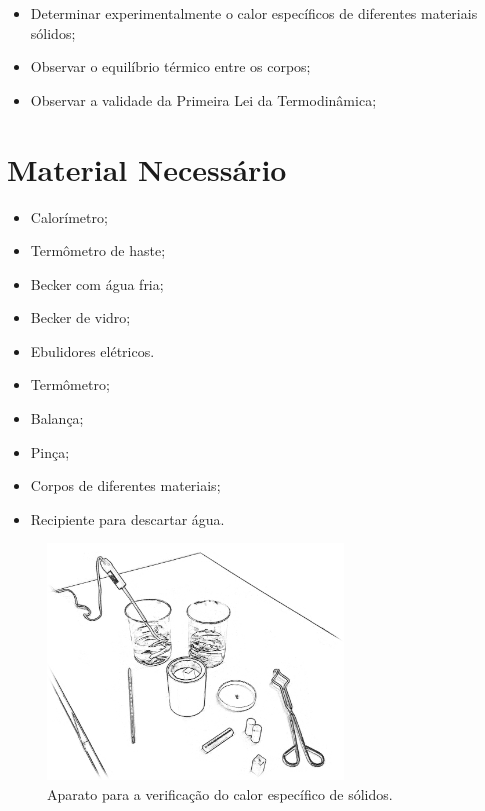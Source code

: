 \begin{itemize}
	\item Determinar experimentalmente o calor específicos de diferentes materiais sólidos;
	\item Observar o equilíbrio térmico entre os corpos;
	\item Observar a validade da Primeira Lei da Termodinâmica;
\end{itemize}

\section{Material Necessário}

\begin{itemize}
	\item Calorímetro;
	\item Termômetro de haste;
	\item Becker com água fria;
	\item Becker de vidro;
	\item Ebulidores elétricos.
	\item Termômetro;
	\item Balança;
	\item Pinça;
	\item Corpos de diferentes materiais;
	\item Recipiente para descartar água.
\end{itemize}

\begin{figure}[!hbt]
	\centering
	\includegraphics[width=0.7\textwidth]{Ilustrations/AparatoCalorEspecifico}
	\caption{Aparato para a verificação do calor específico de sólidos.}
\end{figure}

